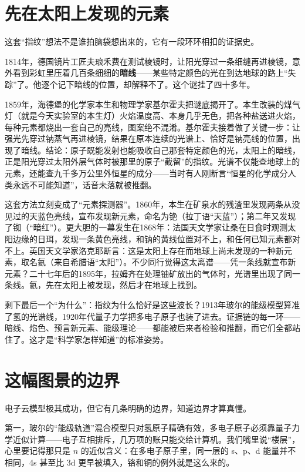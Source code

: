 \section{先在太阳上发现的元素}

\begin{zhengju}
这套“指纹”想法不是谁拍脑袋想出来的，它有一段环环相扣的证据史。

1814年，德国镜片工匠夫琅禾费在测试棱镜时，让阳光穿过一条细缝再进棱镜，意外看到彩虹里压着几百条细细的\textbf{暗线}——某些特定颜色的光在到达地球的路上“失踪”了。他逐个记下暗线的位置，却解释不了。这个谜挂了四十多年。

1859年，海德堡的化学家本生和物理学家基尔霍夫把谜底揭开了。本生改装的煤气灯（就是今天实验室的本生灯）火焰温度高、本身几乎无色，把各种盐送进火焰，每种元素都烧出一套自己的亮线，图案绝不混淆。基尔霍夫接着做了关键一步：让强光先穿过钠蒸气再进棱镜，结果在原本连续的光谱上、恰好是钠亮线的位置，出现了暗线。结论：原子既能发射也能吸收自己那套特定颜色的光，太阳上的暗线，正是阳光穿过太阳外层气体时被那里的原子“截留”的指纹。光谱不仅能查地球上的元素，还能查九千多万公里外恒星的成分——当时有人刚断言“恒星的化学成分人类永远不可能知道”，话音未落就被推翻。

这套方法立刻变成了“元素探测器”。1860年，本生在矿泉水的残渣里发现两条从没见过的天蓝色亮线，宣布发现新元素，命名为铯（拉丁语“天蓝”）；第二年又发现了铷（“暗红”）。更大胆的一幕发生在1868年：法国天文学家让桑在日食时观测太阳边缘的日珥，发现一条黄色亮线，和钠的黄线位置对不上，和任何已知元素都对不上。英国天文学家洛克耶断言：这是太阳上存在而地球上尚未发现的一种新元素，取名氦（来自希腊语“太阳”）。不少同行觉得这太离谱——凭一条线就宣布新元素？二十七年后的1895年，拉姆齐在处理铀矿放出的气体时，光谱里出现了同一条线。氦，先在太阳上被发现，然后才在地球上找到。

剩下最后一个“为什么”：指纹为什么恰好是这些波长？1913年玻尔的能级模型算准了氢的光谱线，1920年代量子力学把多电子原子也装了进去。证据链的每一环——暗线、焰色、预言新元素、能级理论——都能被后来者检验和推翻，而它们全都站住了。这才是“科学家怎样知道”的标准姿势。
\end{zhengju}

\section{这幅图景的边界}

电子云模型极其成功，但它有几条明确的边界，知道边界才算真懂。

第一，玻尔的“能级轨道”混合模型只对氢原子精确有效，多电子原子必须靠量子力学近似计算——电子互相排斥，几万项的账只能交给计算机。我们嘴里说“楼层”，心里要记得那只是 $n$ 的近似含义：在多电子原子里，同一层的 s、p、d 能量并不相同，4s 甚至比 3d 更早被填入，铬和铜的例外就是这么来的。


